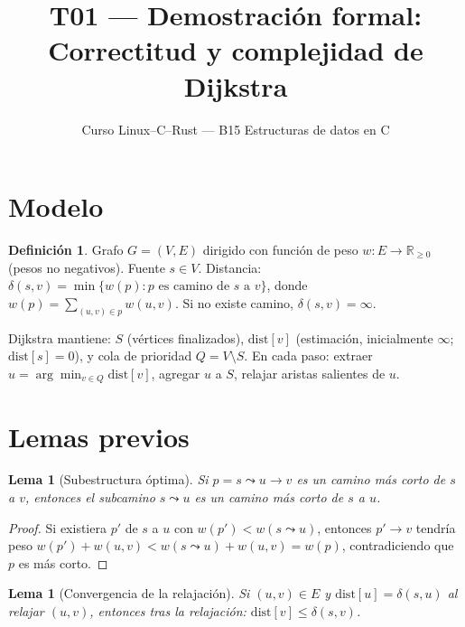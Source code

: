 \documentclass[11pt, letterpaper]{article}
\title{%
  T01 --- Demostración formal:\\[4pt]
  Correctitud y complejidad de Dijkstra
}
\author{Curso Linux--C--Rust --- B15 Estructuras de datos en C}
\date{}
\theoremstyle{definition}
\newtheorem{definition}{Definición}[section]
\theoremstyle{plain}
\newtheorem{lemma}[theorem]{Lema}
\theoremstyle{remark}
\begin{document}
\maketitle
\tableofcontents

\section{Modelo}

\begin{definition}
Grafo $G = (V, E)$ dirigido con función de peso
$w: E \to \mathbb{R}_{\geq 0}$ (pesos no negativos). Fuente
$s \in V$. Distancia:
$\delta(s, v) = \min\{w(p) : p \text{ es camino de } s \text{ a } v\}$,
donde $w(p) = \sum_{(u,v) \in p} w(u,v)$. Si no existe camino,
$\delta(s,v) = \infty$.
\end{definition}

Dijkstra mantiene: $S$ (vértices finalizados),
$\mathrm{dist}[v]$ (estimación, inicialmente $\infty$;
$\mathrm{dist}[s] = 0$), y cola de prioridad $Q = V \setminus S$.
En cada paso: extraer $u = \arg\min_{v \in Q} \mathrm{dist}[v]$,
agregar $u$ a $S$, relajar aristas salientes de $u$.

\section{Lemas previos}

\begin{lemma}[Subestructura óptima]\label{lem:substructure}
Si $p = s \leadsto u \to v$ es un camino más corto de $s$ a $v$,
entonces el subcamino $s \leadsto u$ es un camino más corto de $s$
a $u$.
\end{lemma}

\begin{proof}
Si existiera $p'$ de $s$ a $u$ con $w(p') < w(s \leadsto u)$,
entonces $p' \to v$ tendría peso
$w(p') + w(u,v) < w(s \leadsto u) + w(u,v) = w(p)$, contradiciendo
que $p$ es más corto.
\end{proof}

\begin{lemma}[Convergencia de la relajación]\label{lem:relax}
Si $(u,v) \in E$ y $\mathrm{dist}[u] = \delta(s,u)$ al relajar
$(u,v)$, entonces tras la relajación:
$\mathrm{dist}[v] \leq \delta(s,v)$.
\end{lemma}
\end{document}
